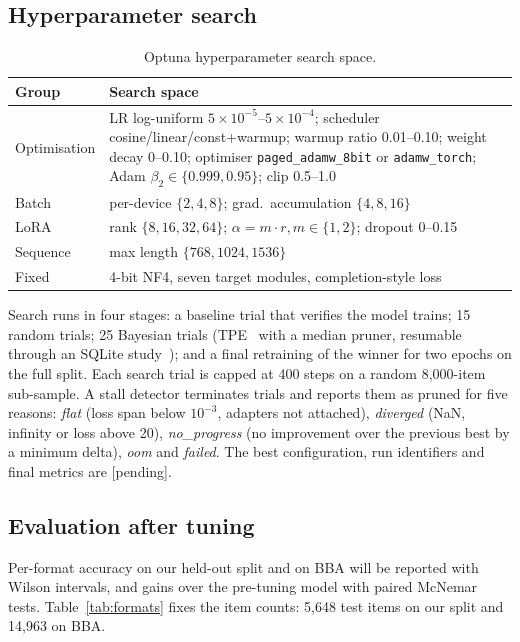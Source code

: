 \documentclass[10pt,twocolumn,letterpaper]{article}
\begin{document}
\subsection{Hyperparameter search}

\begin{table}[t]
\centering
\small
\setlength{\tabcolsep}{4pt}
\begin{tabular}{@{}lp{5.5cm}@{}}
\toprule
\textbf{Group} & \textbf{Search space} \\
\midrule
Optimisation & LR log-uniform $5\times 10^{-5}$--$5\times 10^{-4}$; scheduler cosine/linear/const+warmup; warmup ratio 0.01--0.10; weight decay 0--0.10; optimiser \texttt{paged\_adamw\_8bit} or \texttt{adamw\_torch}; Adam $\beta_2 \in \{0.999, 0.95\}$; clip 0.5--1.0 \\
\addlinespace[2pt]
Batch & per-device $\{2, 4, 8\}$; grad.\ accumulation $\{4, 8, 16\}$ \\
\addlinespace[2pt]
LoRA & rank $\{8, 16, 32, 64\}$; $\alpha = m \cdot r, m \in \{1, 2\}$; dropout 0--0.15 \\
\addlinespace[2pt]
Sequence & max length $\{768, 1024, 1536\}$ \\
\addlinespace[2pt]
Fixed & 4-bit NF4, seven target modules, completion-style loss \\
\bottomrule
\end{tabular}
\caption{Optuna hyperparameter search space.}
\label{tab:optuna}
\end{table}

Search runs in four stages: a baseline trial that verifies the model trains;
15 random trials; 25 Bayesian trials (TPE~\cite{tpe} with a median pruner,
resumable through an SQLite study~\cite{optuna}); and a final retraining of the
winner for two epochs on the full split. Each search trial is capped at 400
steps on a random 8{,}000-item sub-sample. A stall detector terminates trials
and reports them as pruned for five reasons: \textit{flat} (loss span below
$10^{-3}$, adapters not attached), \textit{diverged} (NaN, infinity or loss
above 20), \textit{no\_progress} (no improvement over the previous best by a
minimum delta), \textit{oom} and \textit{failed}. The best configuration, run
identifiers and final metrics are [pending].

\subsection{Evaluation after tuning}

Per-format accuracy on our held-out split and on BBA will be reported with
Wilson intervals, and gains over the pre-tuning model with paired McNemar tests.
Table~\ref{tab:formats} fixes the item counts: 5{,}648 test items on our split
and 14{,}963 on BBA.
\end{document}
